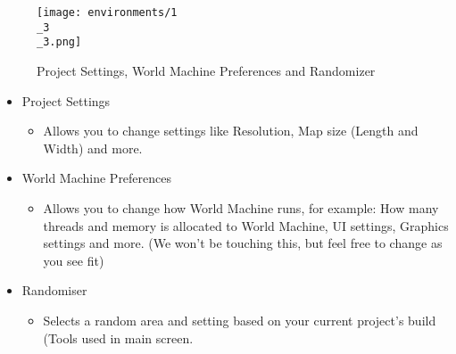 \documentclass[../main.tex]{subfiles}
\begin{document}
\begin{figure}[H]
\texttt{[image: environments/1\\\_3\\\_3.png]}
\caption{Project Settings, World Machine Preferences and Randomizer}
\end{figure}
\begin{itemize}
    \item Project Settings
    \begin{itemize}
        \item Allows you to change settings like Resolution, Map size (Length and Width) and more.
    \end{itemize}
    \item World Machine Preferences
    \begin{itemize}
        \item Allows you to change how World Machine runs, for example: How many threads and memory is allocated to World Machine, UI settings, Graphics settings and more. (We won’t be touching this, but feel free to change as you see fit)
    \end{itemize}
    \item {Randomiser}
    \begin{itemize}
        \item Selects a random area and setting based on your current project’s build (Tools used in main screen.
    \end{itemize}
\end{itemize}
\end{document}
